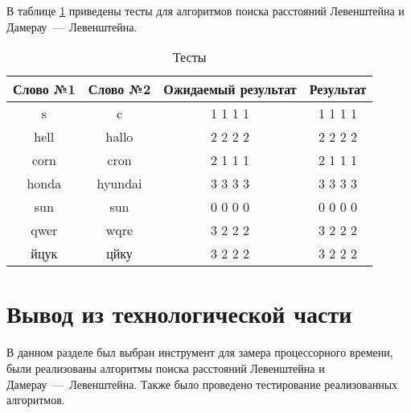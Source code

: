 В таблице \ref{tab:tests} приведены тесты для алгоритмов поиска расстояний Левенштейна и Дамерау~---~Левенштейна.

\begin{table}[h!]
	\begin{center}
    \begin{threeparttable}
        \captionsetup{justification=raggedright,singlelinecheck=off}
        \caption{\label{tab:tests}Тесты}
        \begin{tabular}{|c|c|c|c|}
			\hline
			\textbf{Слово №1} & \textbf{Слово №2} & \textbf{Ожидаемый результат} & \textbf{Результат} \\ [0.8ex] 
			\hline
			s & c & 1 1 1 1 & 1 1 1 1\\
			\hline
			hell & hallo & 2 2 2 2 & 2 2 2 2\\
			\hline
			corn & cron & 2 1 1 1 & 2 1 1 1\\
			\hline
			honda & hyundai & 3 3 3 3 & 3 3 3 3\\
			\hline
			sun & sun & 0 0 0 0 & 0 0 0 0\\
			\hline
			qwer & wqre & 3 2 2 2  & 3 2 2 2\\
			\hline
			йцук & цйку & 3 2 2 2  & 3 2 2 2\\
			\hline
		\end{tabular}
    \end{threeparttable} 
	\end{center}
\end{table}

\section*{Вывод из технологической части}

В данном разделе был выбран инструмент для замера процессорного времени, были реализованы алгоритмы поиска расстояний Левенштейна и Дамерау~---~Левенштейна. Также было проведено тестирование реализованных алгоритмов.
